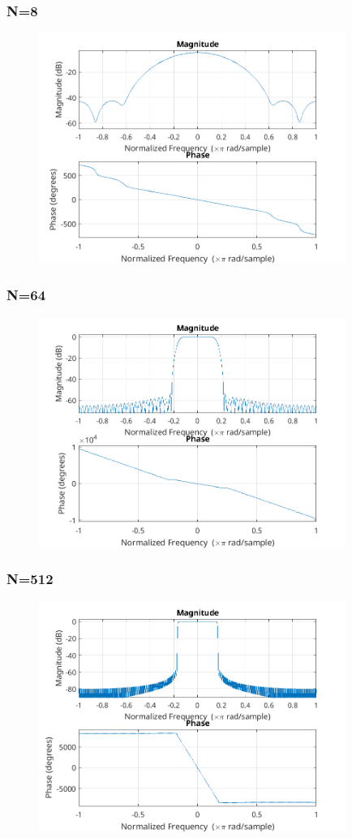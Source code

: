 \documentclass{article}
\begin{document}
  \subsubsection{N=8}
  \begin{figure}[!htb]
  \includegraphics[width=10cm]{freqz_ham_8.png}
  \end{figure}

  \subsubsection{N=64}
  \begin{figure}[!htb]
  \includegraphics[width=10cm]{freqz_ham_64.png}
  \end{figure}

  \subsubsection{N=512}
  \begin{figure}[!htb]
  \includegraphics[width=10cm]{freqz_ham_512.png}
  \end{figure}
\end{document}
